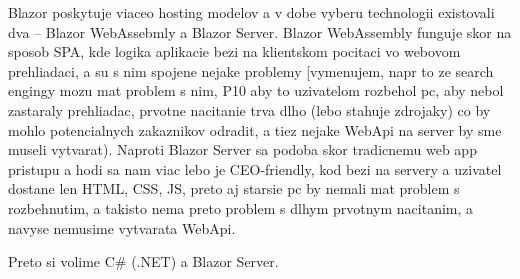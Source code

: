Blazor poskytuje viaceo hosting modelov a v dobe vyberu technologii existovali dva -- Blazor WebAssebmly a Blazor Server. Blazor WebAssembly funguje skor na sposob SPA, kde logika aplikacie bezi na klientskom pocitaci vo webovom prehliadaci, a su s nim spojene nejake problemy [vymenujem, napr to ze search engingy mozu mat problem s nim, P10 aby to uzivatelom rozbehol pc, aby nebol zastaraly prehliadac, prvotne nacitanie trva dlho (lebo stahuje zdrojaky) co by mohlo potencialnych zakaznikov odradit, a tiez nejake WebApi na server by sme museli vytvarat). Naproti Blazor Server sa podoba skor tradicnemu web app pristupu a hodi sa nam viac lebo je CEO-friendly, kod bezi na servery a uzivatel dostane len HTML, CSS, JS, preto aj starsie pc by nemali mat problem s rozbehnutim, a takisto nema preto problem s dlhym prvotnym nacitanim, a navyse nemusime vytvarata WebApi.

Preto si volime C\# (.NET) a Blazor Server.
